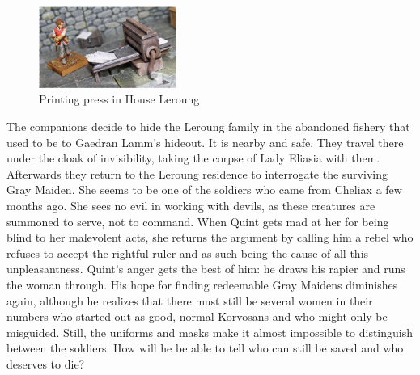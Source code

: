 \begin{figure}[h]
	\centering
	\includegraphics[width=0.4\textwidth]{images/Printing-press-in-House-Leroung-610271575_mod.jpg}
	\caption{Printing press in House Leroung}
	\label{fig:Printing-press-in-House-Leroung-610271575}
\end{figure}

The companions decide to hide the Leroung family in the abandoned fishery that used to be to Gaedran Lamm's hideout. It is nearby and safe. They travel there under the cloak of invisibility, taking the corpse of Lady Eliasia with them. Afterwards they return to the Leroung residence to interrogate the surviving Gray Maiden. She seems to be one of the soldiers who came from Cheliax a few months ago. She sees no evil in working with devils, as these creatures are summoned to serve, not to command. When Quint gets mad at her for being blind to her malevolent acts, she returns the argument by calling him a rebel who refuses to accept the rightful ruler and as such being the cause of all this unpleasantness. Quint's anger gets the best of him: he draws his rapier and runs the woman through. His hope for finding redeemable Gray Maidens diminishes again, although he realizes that there must still be several women in their numbers who started out as good, normal Korvosans and who might only be misguided. Still, the uniforms and masks make it almost impossible to distinguish  between the soldiers. How will he be able to tell who can still be saved and who deserves to die?\\

